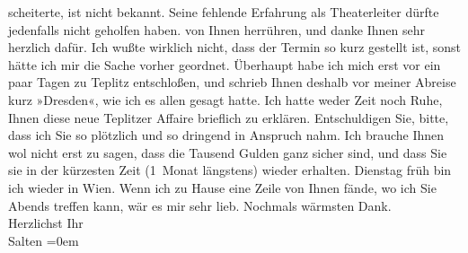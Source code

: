 \begin{ledgroupsized}[t]{13cm}
{{{                  scheiterte, ist nicht bekannt. Seine fehlende Erfahrung als Theaterleiter dürfte
                  jedenfalls nicht geholfen haben.}}}\label{K_L03291-1h} von Ihnen herrühren, und danke Ihnen sehr
               herzlich dafür. Ich wußte wirklich nicht, dass der Termin so kurz gestellt ist, sonst
               hätte ich mir die Sache vorher geordnet. Überhaupt habe ich mich erst vor ein paar
               Tagen zu Teplitz entschloßen, und schrieb Ihnen
               deshalb vor meiner Abreise kurz »Dresden«, wie
               ich es allen gesagt hatte. Ich hatte {\pb}weder Zeit noch Ruhe, Ihnen
               diese neue Teplitzer Affaire brieflich zu
               erklären. Entschuldigen Sie, bitte, dass ich Sie so plötzlich und so dringend in
               Anspruch nahm. Ich brauche Ihnen wol nicht erst zu sagen, dass die Tausend Gulden
               ganz sicher sind, und dass Sie sie in der kürzesten Zeit (1 Monat längstens) wieder
               erhalten.\pend
           \pstart
           Dienstag früh bin ich wieder in Wien. Wenn ich zu Hause eine Zeile von Ihnen fände, wo ich Sie
                  Abends{ }{\pb}treffen kann, wär es mir sehr
               lieb.\pend
           \pstart
           Nochmals wärmsten Dank. {\\[\baselineskip]}Herzlichst Ihr {\\[\baselineskip]}\spacefill\mbox{Salten}\pend
           \leftskip=0em{}
         
         \endnumbering{}\end{ledgroupsized}  \newcommand{\dateiname}{L03291}\newcommand{\titel}{Felix Salten an Arthur Schnitzler, 6. 5. 1899}\newcommand{\editorInnen}{Martin Anton Müller und Laura Untner}
      